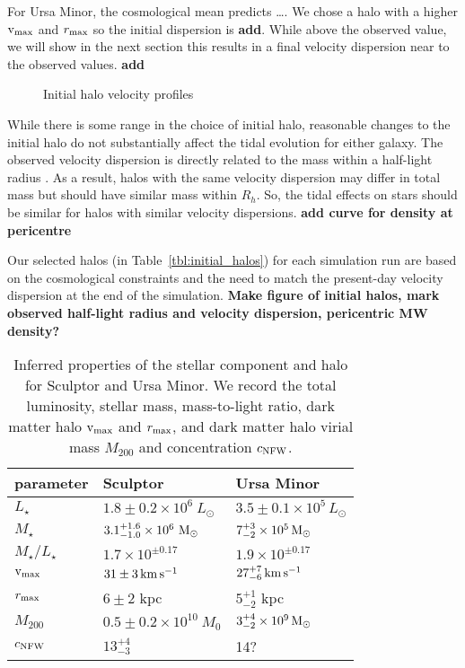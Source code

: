 For Ursa Minor, the cosmological mean predicts \ldots. We chose a halo
with a higher \({\rm v}_{\rm max}\) and \(r_{\rm max}\) so the initial dispersion is
\textbf{add}. While above the observed value, we will show in the next
section this results in a final velocity dispersion near to the observed
values. \textbf{add}

\begin{figure}
\centering
{}
\caption{Initial halo velocity profiles}
\end{figure}

While there is some range in the choice of initial halo, reasonable
changes to the initial halo do not substantially affect the tidal
evolution for either galaxy. The observed velocity dispersion is
directly related to the mass within a half-light radius
\citep[e.g.,][]{wolf+2010}. As a result, halos with the same velocity
dispersion may differ in total mass but should have similar mass within
\(R_h\). So, the tidal effects on stars should be similar for halos with
similar velocity dispersions. \textbf{add curve for density at
pericentre}

Our selected halos (in Table~\ref{tbl:initial_halos}) for each
simulation run are based on the cosmological constraints and the need to
match the present-day velocity dispersion at the end of the simulation.
\textbf{Make figure of initial halos, mark observed half-light radius
and velocity dispersion, pericentric MW density?}

\begin{table*}[t]
\centering
\caption[Derived Properties of Sculptor and Ursa Minor]{Inferred properties of the stellar component and halo for Sculptor and Ursa Minor. We record the total luminosity, stellar mass, mass-to-light ratio, dark matter halo ${\rm v}_{\rm max}$ and $r_{\rm max}$, and dark matter halo virial mass $M_{200}$ and concentration $c_{\rm NFW}$. }
\label{tbl:derived_props}
\begin{tabular}{lll}
\toprule
parameter & Sculptor & Ursa Minor\\
\midrule
$L_\star$ & $1.8\pm0.2\times10^6\ L_\odot$ & $3.5 \pm 0.1 \times 10^5\,L_\odot$\\
$M_\star$ & $3.1_{-1.0}^{+1.6} \times10^6\ {\rm M}_\odot$ & $7_{-2}^{+3} \times 10^5\,{\rm M}_{\odot}$\\
$M_\star / L_\star$ & $1.7\times 10^{\pm 0.17}$ & $1.9 \times 10^{\pm 0.17}$\\
${\rm v}_{\rm max}$ & $31\pm 3\,{\rm km\,s^{-1}}$ & $27_{-6}^{+7}\,{\rm km\,s^{-1}}$\\
$r_{\rm max}$ & $6 \pm 2$ kpc & $5_{-2}^{+1}$ kpc\\
$M_{200}$ & $0.5 \pm 0.2\times10^{10}\ M_0$ & $3_{-2}^{+4} \times 10^9\,{\rm M}_{\odot}$\\
$c_{\rm NFW}$ & $13_{-3}^{+4}$ & 14?\\
\bottomrule
\end{tabular}
\end{table*}

